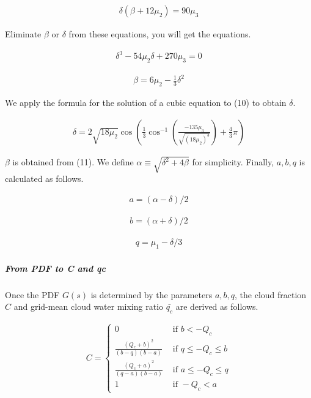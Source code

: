\begin{eqnarray}
\delta\left(\beta+12 \mu_{2}\right)=90 \mu_{3}
\end{eqnarray}

Eliminate \(\beta\) or \(\delta\) from these equations, you will get the
equations.

\begin{eqnarray}
\delta^{3}-54 \mu_{2} \delta+270 \mu_{3}=0
\label{E08-10}
\end{eqnarray}

\begin{eqnarray}
\beta=6 \mu_{2}-\frac{1}{3} \delta^{2}
\label{E08-11}
\end{eqnarray}

We apply the formula for the solution of a cubic equation to (10) to
obtain \(\delta\).

\begin{eqnarray}
\delta=2 \sqrt{18 \mu_{2}} \cos \left(\frac{1}{3} \cos ^{-1}\left(\frac{-135 \mu_{3}}{\sqrt{\left(18 \mu_{2}\right)^{3}}}\right)+\frac{4}{3} \pi\right)
\end{eqnarray}

\(\beta\) is obtained from (11). We define
\(\alpha \equiv\sqrt{\delta^{2}+4 \beta}\) for simplicity. Finally,
\(a,b,q\) is calculated as follows.

\begin{eqnarray}
a=(\alpha-\delta) / 2
\end{eqnarray}

\begin{eqnarray}
b=(\alpha+\delta) / 2
\end{eqnarray}

\begin{eqnarray}
q=\mu_{1}-\delta / 3
\end{eqnarray}

\hypertarget{from-pdf-to-c-and-qc}{%
\subparagraph{From PDF to C and qc}\label{from-pdf-to-c-and-qc}}

Once the PDF \(G(s)\) is determined by the parameters \(a,b,q\), the
cloud fraction \(C\) and grid-mean cloud water mixing ratio
\(\bar{q_c}\) are derived as follows.

\begin{eqnarray}
C=\left\{\begin{array}{ll}
0 & \text { if } b<-Q_{c} \\
\frac{\left(Q_{c}+b\right)^{2}}{(b-q)(b-a)} & \text { if } q \leq-Q_{c} \leq b \\
\frac{\left(Q_{c}+a\right)^{2}}{(q-a)(b-a)} & \text { if } a \leq-Q_{c} \leq q \\
1 & \text { if }-Q_{c}<a
\end{array}\right.
\label{E08-15}
\end{eqnarray}

